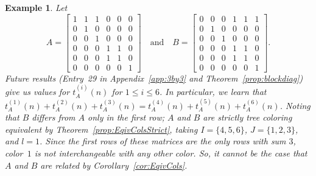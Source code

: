 \documentclass[12pt]{amsart}
\newtheorem{example}{Example}
\begin{document}
\begin{example}\label{ex:iffcounter}
    Let
    \[
A=\begin{bmatrix}
    1 & 1 & 1 & 0 & 0 & 0\\
    0 & 1 & 0 & 0 & 0 & 0\\
    0 & 0 & 1 & 0 & 0 & 0\\
    0 & 0 & 0 & 1 & 1 & 0\\
    0 & 0 & 0 & 1 & 1 & 0\\
    0 & 0 & 0 & 0 & 0 & 1
\end{bmatrix}
\quad\text{and}\quad
B=\begin{bmatrix}
    0 & 0 & 0 & 1 & 1 & 1\\
    0 & 1 & 0 & 0 & 0 & 0\\
    0 & 0 & 1 & 0 & 0 & 0\\
    0 & 0 & 0 & 1 & 1 & 0\\
    0 & 0 & 0 & 1 & 1 & 0\\
    0 & 0 & 0 & 0 & 0 & 1
\end{bmatrix}.
\]
Future results (Entry~29 in Appendix~\ref{app:3by3} and Theorem~\ref{prop:blockdiag}) give us values for $t^{(i)}_A(n)$ for $1\leq i\leq 6$. In particular, we learn 
that $t^{(1)}_A(n)+t^{(2)}_A(n)+t^{(3)}_A(n)=t^{(4)}_A(n)+t^{(5)}_A(n)+t^{(6)}_A(n)$. 
Noting that $B$ differs from $A$ only in the first row; $A$ and $B$ are strictly tree coloring equivalent by Theorem~\ref{prop:EqivColsStrict}, taking $I=\{4,5,6\}$, $J=\{1,2,3\}$, and $l=1$. 
Since the first rows of these matrices are the only rows with sum $3$, color~$1$ is not interchangeable with any other color. So, it cannot be the case that $A$ and $B$ are related by Corollary~\ref{cor:EqivCols}.
\end{example}
\end{document}
